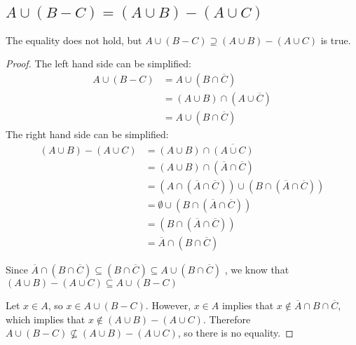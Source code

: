 \subsection{$A \cup (B-C) = (A \cup B) - (A \cup C)$}
The equality does not hold, but $A \cup (B-C) \supseteq (A \cup B) - (A \cup C)$ is true.
\begin{proof} The left hand side can be simplified:
    \begin{align*}
        A \cup (B-C)
        &= A \cup (B \cap \overline{C})\\
        &= (A \cup B) \cap (A \cup \overline{C})\\
        &= A \cup (B \cap \overline{C})
    \end{align*}
    The right hand side can be simplified:
    \begin{align*}
        (A \cup B) - (A \cup C)
        &= (A \cup B) \cap \overline{(A \cup C)}\\
        &= (A \cup B) \cap (\overline{A} \cap \overline{C})\\
        &= (A \cap (\overline{A} \cap \overline{C})) \cup (B \cap (\overline{A} \cap \overline{C}))\\
        &= \emptyset \cup (B \cap (\overline{A} \cap \overline{C}))\\
        &= (B \cap (\overline{A} \cap \overline{C}))\\
        &= \overline{A} \cap (B  \cap \overline{C})
    \end{align*}
    
    Since $\overline{A} \cap (B  \cap \overline{C}) \subseteq (B \cap \overline{C}) \subseteq A \cup (B \cap \overline{C})$
    , we know that 
    $(A \cup B) - (A \cup C) \subseteq A \cup (B-C)$\gap
    
    Let $x \in A$, so $x \in A \cup (B-C)$. 
    However, $x \in A$ implies that $x \not\in \overline{A} \cap B  \cap \overline{C}$,
    which implies that $x \not\in (A \cup B) - (A \cup C)$. 
    Therefore $A \cup (B-C) \nsubseteq (A \cup B) - (A \cup C)$, so there is no equality.
\end{proof}


